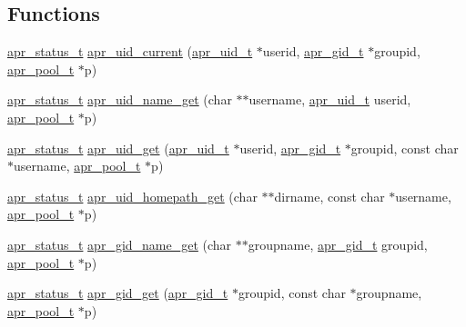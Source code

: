 \subsection*{Functions}
\begin{DoxyCompactItemize}
\item 
\hyperlink{group__apr__errno_gaf76ee4543247e9fb3f3546203e590a6c}{apr\+\_\+status\+\_\+t} \hyperlink{group__apr__user_ga6583c5814fcf3924a2e391dac126f8a9}{apr\+\_\+uid\+\_\+current} (\hyperlink{group__apr__user_gad1aa508f584bc230acf4f68ba4fc4de7}{apr\+\_\+uid\+\_\+t} $\ast$userid, \hyperlink{group__apr__user_ga22e9e224e984f837f3e276833e2f3a55}{apr\+\_\+gid\+\_\+t} $\ast$groupid, \hyperlink{group__apr__pools_gaf137f28edcf9a086cd6bc36c20d7cdfb}{apr\+\_\+pool\+\_\+t} $\ast$p)
\item 
\hyperlink{group__apr__errno_gaf76ee4543247e9fb3f3546203e590a6c}{apr\+\_\+status\+\_\+t} \hyperlink{group__apr__user_gad56be7519e060a3c6698657f51ab6bc8}{apr\+\_\+uid\+\_\+name\+\_\+get} (char $\ast$$\ast$username, \hyperlink{group__apr__user_gad1aa508f584bc230acf4f68ba4fc4de7}{apr\+\_\+uid\+\_\+t} userid, \hyperlink{group__apr__pools_gaf137f28edcf9a086cd6bc36c20d7cdfb}{apr\+\_\+pool\+\_\+t} $\ast$p)
\item 
\hyperlink{group__apr__errno_gaf76ee4543247e9fb3f3546203e590a6c}{apr\+\_\+status\+\_\+t} \hyperlink{group__apr__user_ga4b82187f32db9350f2e02165bbce965b}{apr\+\_\+uid\+\_\+get} (\hyperlink{group__apr__user_gad1aa508f584bc230acf4f68ba4fc4de7}{apr\+\_\+uid\+\_\+t} $\ast$userid, \hyperlink{group__apr__user_ga22e9e224e984f837f3e276833e2f3a55}{apr\+\_\+gid\+\_\+t} $\ast$groupid, const char $\ast$username, \hyperlink{group__apr__pools_gaf137f28edcf9a086cd6bc36c20d7cdfb}{apr\+\_\+pool\+\_\+t} $\ast$p)
\item 
\hyperlink{group__apr__errno_gaf76ee4543247e9fb3f3546203e590a6c}{apr\+\_\+status\+\_\+t} \hyperlink{group__apr__user_ga0ad8087cf1c6257a286cf5215da8107e}{apr\+\_\+uid\+\_\+homepath\+\_\+get} (char $\ast$$\ast$dirname, const char $\ast$username, \hyperlink{group__apr__pools_gaf137f28edcf9a086cd6bc36c20d7cdfb}{apr\+\_\+pool\+\_\+t} $\ast$p)
\item 
\hyperlink{group__apr__errno_gaf76ee4543247e9fb3f3546203e590a6c}{apr\+\_\+status\+\_\+t} \hyperlink{group__apr__user_gadda2c777f2e8d61c02be34305720e316}{apr\+\_\+gid\+\_\+name\+\_\+get} (char $\ast$$\ast$groupname, \hyperlink{group__apr__user_ga22e9e224e984f837f3e276833e2f3a55}{apr\+\_\+gid\+\_\+t} groupid, \hyperlink{group__apr__pools_gaf137f28edcf9a086cd6bc36c20d7cdfb}{apr\+\_\+pool\+\_\+t} $\ast$p)
\item 
\hyperlink{group__apr__errno_gaf76ee4543247e9fb3f3546203e590a6c}{apr\+\_\+status\+\_\+t} \hyperlink{group__apr__user_gac65178a647d34387781dc8d7ade3cefc}{apr\+\_\+gid\+\_\+get} (\hyperlink{group__apr__user_ga22e9e224e984f837f3e276833e2f3a55}{apr\+\_\+gid\+\_\+t} $\ast$groupid, const char $\ast$groupname, \hyperlink{group__apr__pools_gaf137f28edcf9a086cd6bc36c20d7cdfb}{apr\+\_\+pool\+\_\+t} $\ast$p)
\end{DoxyCompactItemize}


